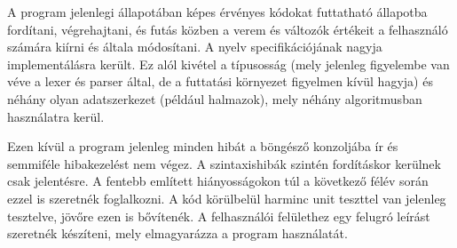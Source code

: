 A program jelenlegi állapotában képes érvényes kódokat futtatható állapotba fordítani, végrehajtani, és futás közben a verem és változók értékeit a felhasználó számára kiírni és általa módosítani. A nyelv specifikációjának nagyja implementálásra került. Ez alól kivétel a típusosság (mely jelenleg figyelembe van véve a lexer és parser által, de a futtatási környezet figyelmen kívül hagyja) és néhány olyan adatszerkezet (például halmazok), mely néhány algoritmusban használatra kerül.

Ezen kívül a program jelenleg minden hibát a böngésző konzoljába ír és semmiféle hibakezelést nem végez. A szintaxishibák szintén fordításkor kerülnek csak jelentésre. A fentebb említett hiányosságokon túl a következő félév során ezzel is szeretnék foglalkozni. A kód körülbelül harminc unit teszttel van jelenleg tesztelve, jövőre ezen is bővítenék. A felhasználói felülethez egy felugró leírást szeretnék készíteni, mely elmagyarázza a program használatát.